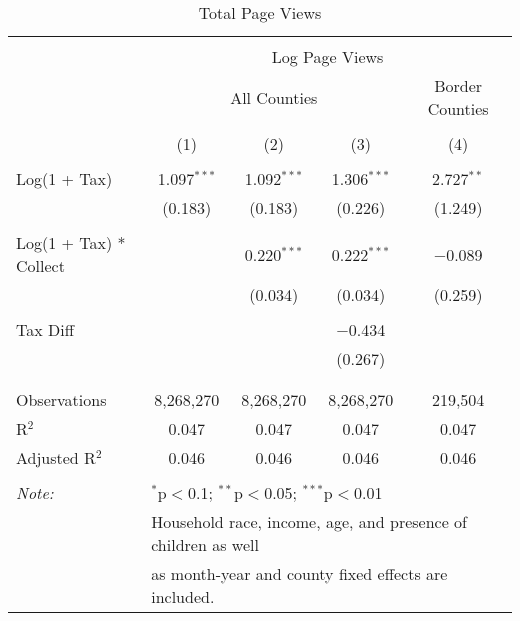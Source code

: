 
\begin{table}[!htbp] \centering 
  \caption{Total Page Views} 
  \label{} 
\begin{tabular}{@{\extracolsep{5pt}}lcccc} 
\\[-1.8ex]\hline 
\hline \\[-1.8ex] 
 & \multicolumn{4}{c}{Log Page Views} \\ 
\cline{2-5} 
 & \multicolumn{3}{c}{All Counties} & Border Counties \\ 
\\[-1.8ex] & (1) & (2) & (3) & (4)\\ 
\hline \\[-1.8ex] 
 Log(1 + Tax) & 1.097$^{***}$ & 1.092$^{***}$ & 1.306$^{***}$ & 2.727$^{**}$ \\ 
  & (0.183) & (0.183) & (0.226) & (1.249) \\ 
  & & & & \\ 
 Log(1 + Tax) * Collect &  & 0.220$^{***}$ & 0.222$^{***}$ & $-$0.089 \\ 
  &  & (0.034) & (0.034) & (0.259) \\ 
  & & & & \\ 
 Tax Diff &  &  & $-$0.434 &  \\ 
  &  &  & (0.267) &  \\ 
  & & & & \\ 
\hline \\[-1.8ex] 
Observations & 8,268,270 & 8,268,270 & 8,268,270 & 219,504 \\ 
R$^{2}$ & 0.047 & 0.047 & 0.047 & 0.047 \\ 
Adjusted R$^{2}$ & 0.046 & 0.046 & 0.046 & 0.046 \\ 
\hline 
\hline \\[-1.8ex] 
\textit{Note:}  & \multicolumn{4}{l}{$^{*}$p$<$0.1; $^{**}$p$<$0.05; $^{***}$p$<$0.01} \\ 
 & \multicolumn{4}{l}{Household race, income, age, and presence of children as well} \\ 
 & \multicolumn{4}{l}{as month-year and county fixed effects are included.} \\ 
\end{tabular} 
\end{table} 
